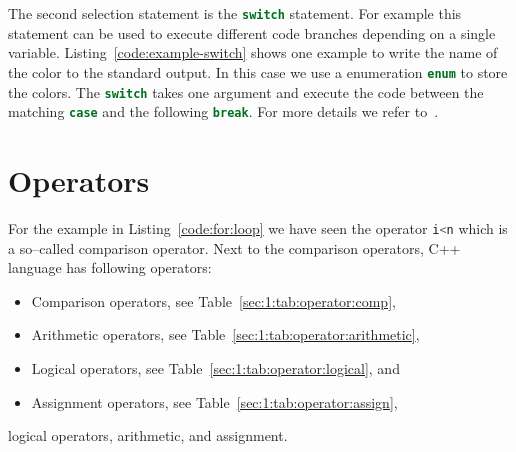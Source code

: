 


The second selection statement is the \lstinline[language=c++]{switch} statement. For example this statement can be used to execute different code branches depending on a single variable. Listing~\ref{code:example-switch} shows one example to write the name of the color to the standard output. In this case we use a enumeration \lstinline[language=c++]{enum} to store the colors. The \lstinline[language=c++]{switch} takes one argument and execute the code between the matching \lstinline[language=c++]{case} and the following \lstinline[language=c++]{break}. For more details we refer to~\cite[Chapter~2]{andrew2000accelerated}.  





\section{Operators}
For the example in Listing~\ref{code:for:loop} we have seen the operator \lstinline[language=C++]|i<n| which is a so--called comparison operator. Next to the comparison operators, C++ language has following operators:
\begin{itemize}
\item Comparison operators, see Table~\ref{sec:1:tab:operator:comp},
\item Arithmetic operators, see Table~\ref{sec:1:tab:operator:arithmetic},
\item Logical operators, see Table~\ref{sec:1:tab:operator:logical}, and
\item Assignment operators, see Table~\ref{sec:1:tab:operator:assign},
\end{itemize}
 logical operators, arithmetic, and assignment.

